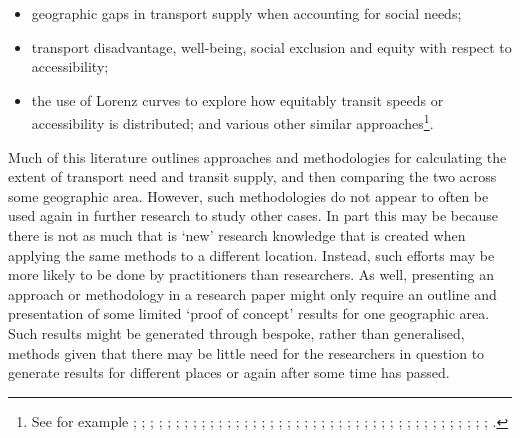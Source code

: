 \documentclass[preprint, 3p,
authoryear]{elsarticle} %
\begin{document}
\begin{itemize}
\item
  geographic gaps in transport supply when accounting for social needs;
\item
  transport disadvantage, well-being, social exclusion and equity with
  respect to accessibility;
\item
  the use of Lorenz curves to explore how equitably transit speeds or
  accessibility is distributed; and various other similar
  approaches\footnote{See for example \citet{Ricciardi2015}
    \citet{Currie2003Hobart}; \citet{currie2010identifying};
    \citet{Fransen2015Identifying}; \citet{Guzman2017Assessing};
    \citet{Jaramillo2012}; \citet{Preston2007};
    \citet{Delbosc2011Transportproblems}; \citet{Delbosc2011Thespatial};
    \citet{Engels2011Social}; \citet{Pavkova2016};
    \citet{Delbosc2011Using}; \citet{Murray2001};
    \citet{Currie2010Modeling}; \citet{Currie2007Investigating};
    \citet{Currie2007Identifying}; \citet{Yigitcanlar2007};
    \citet{Wu2003}; \citet{Currie2013Exploring};
    \citet{Preston2007Accessibility}; \citet{Hurni2005};
    \citet{Mamun2011}; \citet{El_geneidy2016}; \citet{Kaplan2014};
    \citet{Martens2012}; \citet{Lucas2016AMethod};
    \citet{Liu2012Accessibility}; \citet{Lucas2012Transport_and_social};
    \citet{Lei2010Mapping}; \citet{Mavoa2012GIS};
    \citet{Delmelle2012Evaluating}; \citet{Foth2014Toward};
    \citet{Welch2013Equity}; \citet{Bell2007Travel};
    \citet{Jaramillob2011Urban}; \citet{Guzman2017Assessing};
    \citet{Wee2011Discussing}; \citet{Currie2004Gap};
    \citet{Engels2011Social}; \citet{Litman2002Evaluation};
    \citet{Parolin2017Identifying}; \citet{Xia2016AMulti};
    \citet{Welch2013AMeasure}; \citet{Jang2017Assessing}.}.
\end{itemize}

Much of this literature outlines approaches and methodologies for
calculating the extent of transport need and transit supply, and then
comparing the two across some geographic area. However, such
methodologies do not appear to often be used again in further research
to study other cases. In part this may be because there is not as much
that is `new' research knowledge that is created when applying the same
methods to a different location. Instead, such efforts may be more
likely to be done by practitioners than researchers. As well, presenting
an approach or methodology in a research paper might only require an
outline and presentation of some limited `proof of concept' results for
one geographic area.\\
Such results might be generated through bespoke, rather than
generalised, methods given that there may be little need for the
researchers in question to generate results for different places or
again after some time has passed.
\end{document}
